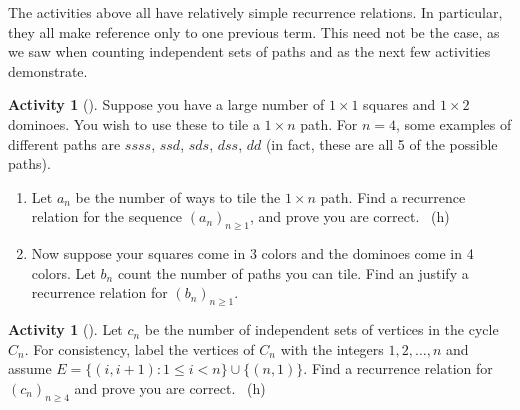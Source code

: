 \documentclass[10pt,]{book}
\theoremstyle{plain}
\theoremstyle{definition}
\theoremstyle{definition}
\theoremstyle{definition}
\newtheorem{activity}[project]{Activity}
\numberwithin{equation}{chapter}
\def\st{:}
\newcommand{\lt}{<}
\begin{document}
\hypertarget{p-906}{}%
The activities above all have relatively simple recurrence relations.  In particular, they all make reference only to one previous term.  This need not be the case, as we saw when counting independent sets of paths and as the next few activities demonstrate.%
\begin{activity}[]\label{act-dominoes}
\hypertarget{p-907}{}%
Suppose you have a large number of \(1\times 1\) squares and \(1 \times 2\) dominoes.  You wish to use these to tile a \(1 \times n\) path.  For \(n = 4\), some examples of different paths are \(ssss\), \(ssd\), \(sds\), \(dss\), \(dd\) (in fact, these are all 5 of the possible paths).%
\begin{enumerate}[font=\bfseries,label=(\alph*),ref=\alph*]
\item\label{task-171} \hypertarget{p-908}{}%
Let \(a_n\) be the number of ways to tile the \(1 \times n\) path.  Find a recurrence relation for the sequence \((a_n)_{n \ge 1}\), and prove you are correct.%
~{\tiny (h)}\item\label{task-172} \hypertarget{p-910}{}%
Now suppose your squares come in 3 colors and the dominoes come in 4 colors.  Let \(b_n\) count the number of paths you can tile.  Find an justify a recurrence relation for \((b_n)_{n \ge 1}\).%
\end{enumerate}
\end{activity}
\begin{activity}[]\label{activity-133}
\hypertarget{p-911}{}%
Let \(c_n\) be the number of independent sets of vertices in the cycle \(C_n\).  For consistency, label the vertices of \(C_n\) with the integers \(1, 2, \ldots, n\) and assume \(E = \{(i, i+1) \st 1 \le i \lt n\} \cup \{(n, 1)\}\). Find a recurrence relation for \((c_n)_{n\ge 4}\) and prove you are correct.%
~{\tiny (h)}\end{activity}
\end{document}
